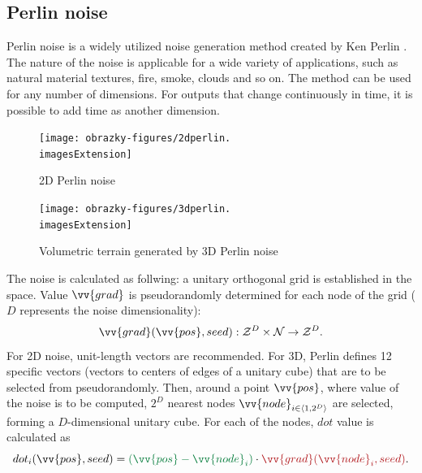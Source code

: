 \subsection{Perlin noise}
Perlin noise is a widely utilized noise generation method created by Ken Perlin \cite{Perlin:1985:IS:325165.325247,PerlinKen2002In}. The nature of the noise is applicable for a wide variety of applications, such as natural material textures, fire, smoke, clouds and so on. The method can be used for any number of dimensions. For outputs that change continuously in time, it is possible to add time as another dimension.

\begin{figure}[H]
	\centering
	\begin{minipage}[t]{0.48\textwidth}
		\centering
		\texttt{[image: obrazky-figures/2dperlin.\\imagesExtension]}
		\caption{2D Perlin noise}
	\end{minipage}
	\hfill
	\begin{minipage}[t]{0.48\textwidth}
		\centering
		\texttt{[image: obrazky-figures/3dperlin.\\imagesExtension]}
		\caption{Volumetric terrain generated by 3D Perlin noise}
	\end{minipage}
\end{figure}

The noise is calculated as follwing: a unitary orthogonal grid is established in the space. Value  $\vv{grad}$ is pseudorandomly determined for each node of the grid ($D$ represents the noise dimensionality):
\begin{equation}
	\vv{grad}(\vv{pos}, seed): \mathcal{Z}^D \times \mathcal{N} \rightarrow \mathcal{Z}^D \text{.}
\end{equation}
For 2D noise, unit-length vectors are recommended. For 3D, Perlin defines 12 specific vectors (vectors to centers of edges of a unitary cube) that are to be selected from pseudorandomly. Then, around a point $\vv{pos}$, where value of the noise is to be computed, $2^D$ nearest nodes $\vv{node}_{i \in \langle1, 2^D\rangle}$ are selected, forming a $D$-dimensional unitary cube. For each of the nodes, $dot$ value is calculated as
\begin{equation}
dot_i(\vv{pos}, seed) = \mathbin{\color{darkgreen}(\vv{pos} - \vv{node}_i)} \cdot \mathbin{\color{darkred}\vv{grad}(\vv{node}_i, seed)} \text{.}
\end{equation}

